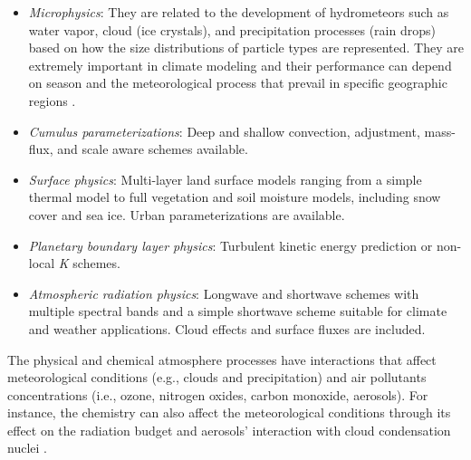 \begin{itemize}
	\item \textit{Microphysics}: They are related to the development of hydrometeors such as water vapor, cloud (ice crystals), and precipitation processes (rain drops) based on how the size distributions of particle types are represented. They are extremely important in climate modeling and their performance can depend on season and the meteorological process that prevail in specific geographic regions \citep{Warner2011}.
	\item \textit{Cumulus parameterizations}: Deep and shallow convection, adjustment, mass-flux, and scale aware schemes available.
	\item \textit{Surface physics}: Multi-layer land surface models ranging from a simple thermal model to full vegetation and soil moisture models, including snow cover and sea ice. Urban parameterizations are available.
	\item \textit{Planetary boundary layer physics}: Turbulent kinetic energy prediction or non-local \textit{K} schemes.
	\item \textit{Atmospheric radiation physics}: Longwave and shortwave schemes with multiple spectral bands and a simple shortwave scheme suitable for climate and weather applications. Cloud effects and surface fluxes are included.
\end{itemize}

The physical and chemical atmosphere processes have interactions that affect meteorological conditions (e.g., clouds and precipitation) and air pollutants concentrations (i.e., ozone, nitrogen oxides, carbon monoxide, aerosols).
For instance, the chemistry can also affect the meteorological conditions through its effect on the radiation budget and aerosols' interaction with cloud condensation nuclei \citep{Grell2005}.

